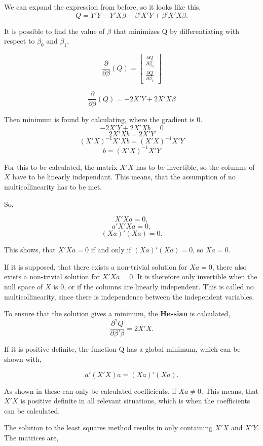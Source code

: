 	We can expand the expression from before, so it looks like this,
	$$Q=Y' Y -Y' X \beta -\beta' X' Y + \beta' X' X \beta .$$
	
	
	It is possible to find the value of $\beta$ that minimizes Q by differentiating with respect to $\beta_0$ and $\beta_1$,
	
	$$
	\frac{\partial}{\partial \beta}(Q)=
	\left[
	\begin{array}{c}
		\frac{\partial Q}{\partial \beta_0}\\ 
		\frac{\partial Q}{\partial \beta_1}
	\end{array}
	\right]
	$$
	
	$$
	\frac{\partial}{\partial \beta}(Q)=-2 X' Y + 2X' X \beta$$
	
	Then minimum is found by calculating, where the gradient is 0.
	$$-2 X' Y+ 2X' X b=0$$
	$$ 2X' X b = 2X' Y$$
	$$(X' X)^{-1} X' X b = (X' X)^{-1} X' Y$$
	$$ b =(X' X)^{-1} X' Y$$
	
	
	For this to be calculated, the matrix $X' X$ has to be invertible, so the columns of $X$ have to be linearly independant.
	This means, that the assumption of no multicollinearity has to be met.
	
	So, 
	
	$$X' Xa  =0,$$
	$$ a' X' X a =0,$$
	$$(Xa)'(Xa)=0.$$
	
	This shows, that $X'Xa=0$ if and only if $(Xa)'(Xa)=0$, so $Xa=0$. 
	
	If it is supposed, that there exists a non-trivial solution for $Xa=0$, there also exists a non-trivial solution for $X'Xa=0$. It is therefore only invertible when the null space of $X$ is 0, or if the columns are linearly independent. This is called no multicollinearity, since there is independence between the independent variables. 
	
	To ensure that the solution gives a minimum, the \textbf{Hessian} is calculated,
	$$\frac{\partial^2 Q}{\partial \beta' \beta}=2X'X.$$
	
	If it is positive definite, the function Q has a global minimum, which can be shown with,
	
	$$a' (X' X)a = (Xa)' (Xa).$$
	
	As shown in %
	these can only be calculated coefficients, if $Xa \not= 0$. This means, that $X'X$ is positive definite in all relevant situations, which is when the coefficients can be calculated. 
	
	The solution to the least squares method results in only containing $X'X$ and $X'Y$.
	The matrices are,
	

